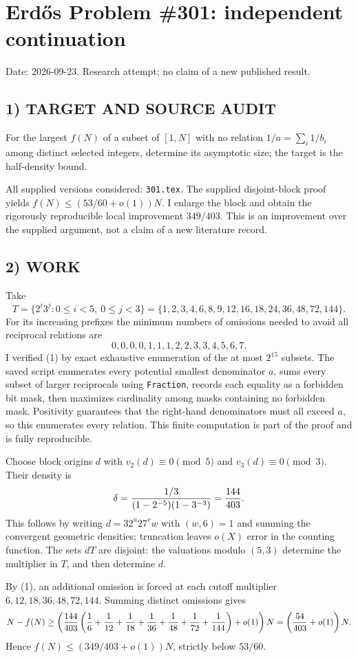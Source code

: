 \section{Erd\H{o}s Problem \#301: independent continuation}
\noindent Date: 2026-09-23. Research attempt; no claim of a new published result.
\subsection{1) TARGET AND SOURCE AUDIT}
For the largest $f(N)$ of a subset of $[1,N]$ with no relation $1/a=\sum_i1/b_i$ among distinct selected integers, determine its asymptotic size; the target is the half-density bound.

All supplied versions considered: \texttt{301.tex}.
The supplied disjoint-block proof yields $f(N)\le(53/60+o(1))N$. I enlarge the block and obtain the rigorously reproducible local improvement $349/403$. This is an improvement over the supplied argument, not a claim of a new literature record.
\subsection{2) WORK}
Take
\[
T=\{2^i3^j:0\le i<5,\ 0\le j<3\}
=\{1,2,3,4,6,8,9,12,16,18,24,36,48,72,144\}.
\]
For its increasing prefixes the minimum numbers of omissions needed to avoid all reciprocal relations are
\[
0,0,0,0,1,1,1,2,2,3,3,4,5,6,7. \tag{1}
\]
I verified (1) by exact exhaustive enumeration of the at most $2^{15}$ subsets. The saved script enumerates every potential smallest denominator $a$, sums every subset of larger reciprocals using \texttt{Fraction}, records each equality as a forbidden bit mask, then maximizes cardinality among masks containing no forbidden mask. Positivity guarantees that the right-hand denominators must all exceed $a$, so this enumerates every relation. This finite computation is part of the proof and is fully reproducible.

Choose block origins $d$ with $v_2(d)\equiv0\pmod5$ and $v_3(d)\equiv0\pmod3$. Their density is
\[
\delta={1/3\over(1-2^{-5})(1-3^{-3})}={144\over403}.
\]
This follows by writing $d=32^u27^v w$ with $(w,6)=1$ and summing the convergent geometric densities; truncation leaves $o(X)$ error in the counting function. The sets $dT$ are disjoint: the valuations modulo $(5,3)$ determine the multiplier in $T$, and then determine $d$.

By (1), an additional omission is forced at each cutoff multiplier $6,12,18,36,48,72,144$. Summing distinct omissions gives
\[
N-f(N)\ge\left({144\over403}\left({1\over6}+{1\over12}+{1\over18}+{1\over36}+{1\over48}+{1\over72}+{1\over144}\right)+o(1)\right)N
=\left({54\over403}+o(1)\right)N.
\]
Hence $f(N)\le(349/403+o(1))N$, strictly below $53/60$.
